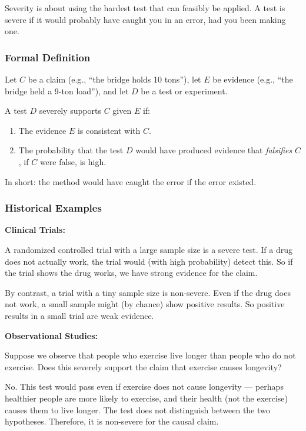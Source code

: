 \documentclass[11pt,letterpaper]{article}
\begin{document}
Severity is about using the hardest test that can feasibly be applied. A test is severe if it would probably have caught you in an error, had you been making one.

\subsubsection*{Formal Definition}

Let $C$ be a claim (e.g., ``the bridge holds 10 tons''), let $E$ be evidence (e.g., ``the bridge held a 9-ton load''), and let $D$ be a test or experiment.

A test $D$ severely supports $C$ given $E$ if:
\begin{enumerate}
  \item The evidence $E$ is consistent with $C$.
  \item The probability that the test $D$ would have produced evidence that \emph{falsifies} $C$, if $C$ were false, is high.
\end{enumerate}

In short: the method would have caught the error if the error existed.

\subsubsection*{Historical Examples}

\textbf{Clinical Trials:}

A randomized controlled trial with a large sample size is a severe test. If a drug does not actually work, the trial would (with high probability) detect this. So if the trial shows the drug works, we have strong evidence for the claim.

By contrast, a trial with a tiny sample size is non-severe. Even if the drug does not work, a small sample might (by chance) show positive results. So positive results in a small trial are weak evidence.

\textbf{Observational Studies:}

Suppose we observe that people who exercise live longer than people who do not exercise. Does this severely support the claim that exercise causes longevity?

No. This test would pass even if exercise does not cause longevity — perhaps healthier people are more likely to exercise, and their health (not the exercise) causes them to live longer. The test does not distinguish between the two hypotheses. Therefore, it is non-severe for the causal claim.
\end{document}
